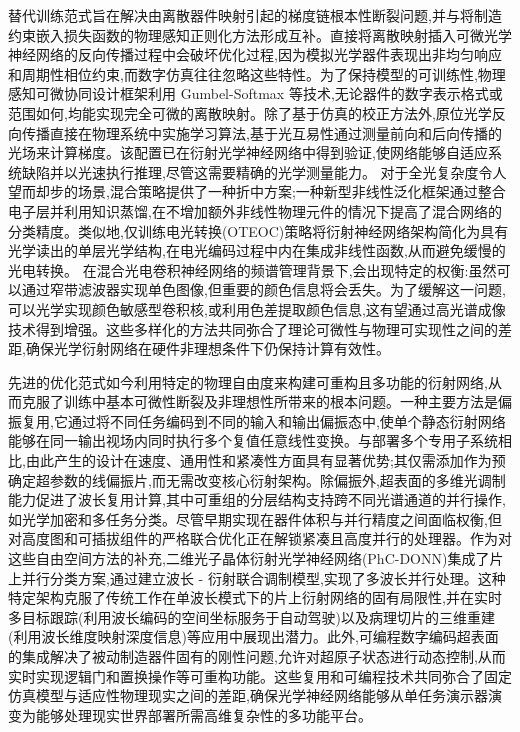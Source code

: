 替代训练范式旨在解决由离散器件映射引起的梯度链根本性断裂问题,并与将制造约束嵌入损失函数的物理感知正则化方法形成互补。直接将离散映射插入可微光学神经网络的反向传播过程中会破坏优化过程,因为模拟光学器件表现出非均匀响应和周期性相位约束,而数字仿真往往忽略这些特性。为了保持模型的可训练性,物理感知可微协同设计框架利用 Gumbel-Softmax 等技术,无论器件的数字表示格式或范围如何,均能实现完全可微的离散映射。除了基于仿真的校正方法外,原位光学反向传播直接在物理系统中实施学习算法,基于光互易性通过测量前向和后向传播的光场来计算梯度。该配置已在衍射光学神经网络中得到验证,使网络能够自适应系统缺陷并以光速执行推理,尽管这需要精确的光学测量能力。\citep{doi_10_1364_prj_389553_d7a30418} 对于全光复杂度令人望而却步的场景,混合策略提供了一种折中方案;一种新型非线性泛化框架通过整合电子层并利用知识蒸馏,在不增加额外非线性物理元件的情况下提高了混合网络的分类精度。类似地,仅训练电光转换(OTEOC)策略将衍射神经网络架构简化为具有光学读出的单层光学结构,在电光编码过程中内在集成非线性函数,从而避免缓慢的光电转换。\citep{doi_10_1364_oe_462370_1269b480} 在混合光电卷积神经网络的频谱管理背景下,会出现特定的权衡:虽然可以通过窄带滤波器实现单色图像,但重要的颜色信息将会丢失。为了缓解这一问题,可以光学实现颜色敏感型卷积核,或利用色差提取颜色信息,这有望通过高光谱成像技术得到增强。这些多样化的方法共同弥合了理论可微性与物理可实现性之间的差距,确保光学衍射网络在硬件非理想条件下仍保持计算有效性。\citep{doi_10_1145_3508352_3549378_13c53996} \citep{doi_10_1364_prj_389553_d7a30418} \citep{doi_10_1364_oe_446890_26d35f03} \citep{doi_10_1364_oe_462370_1269b480} \citep{doi_10_1038_s41598_018_30619_y_5f5bfb09}

先进的优化范式如今利用特定的物理自由度来构建可重构且多功能的衍射网络,从而克服了训练中基本可微性断裂及非理想性所带来的根本问题。一种主要方法是偏振复用,它通过将不同任务编码到不同的输入和输出偏振态中,使单个静态衍射网络能够在同一输出视场内同时执行多个复值任意线性变换。与部署多个专用子系统相比,由此产生的设计在速度、通用性和紧凑性方面具有显著优势;其仅需添加作为预确定超参数的线偏振片,而无需改变核心衍射架构。除偏振外,超表面的多维光调制能力促进了波长复用计算,其中可重组的分层结构支持跨不同光谱通道的并行操作,如光学加密和多任务分类。尽管早期实现在器件体积与并行精度之间面临权衡,但对高度图和可插拔组件的严格联合优化正在解锁紧凑且高度并行的处理器。作为对这些自由空间方法的补充,二维光子晶体衍射光学神经网络(PhC-DONN)集成了片上并行分类方案,通过建立波长 - 衍射联合调制模型,实现了多波长并行处理。这种特定架构克服了传统工作在单波长模式下的片上衍射网络的固有局限性,并在实时多目标跟踪(利用波长编码的空间坐标服务于自动驾驶)以及病理切片的三维重建(利用波长维度映射深度信息)等应用中展现出潜力。此外,可编程数字编码超表面的集成解决了被动制造器件固有的刚性问题,允许对超原子状态进行动态控制,从而实时实现逻辑门和置换操作等可重构功能。这些复用和可编程技术共同弥合了固定仿真模型与适应性物理现实之间的差距,确保光学神经网络能够从单任务演示器演变为能够处理现实世界部署所需高维复杂性的多功能平台。\citep{doi_10_1038_s41377_022_00849_x_e31226af} \citep{doi_10_1515_nanoph_2024_0483_f81cb7ab} \citep{doi_10_1038_s41928_022_00719_9_a2169947} \citep{doi_10_1515_nanoph_2025_0168_86a0f7aa}

